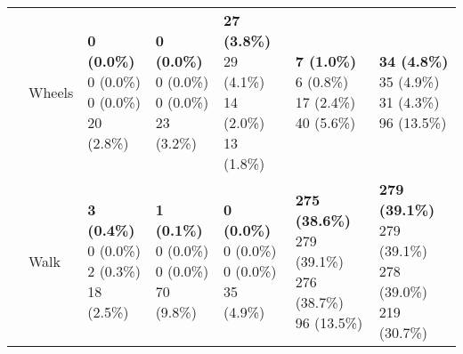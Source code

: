\begin{table}
\begin{center}
\begin{small}
\begin{tabular}{lllllll}
& Wheels      &  \makecell[l]{\textbf{0 (0.0\%)} \\0 (0.0\%) \\0 (0.0\%) \\20 (2.8\%)}      &  \makecell[l]{\textbf{0 (0.0\%)} \\0 (0.0\%) \\0 (0.0\%) \\23 (3.2\%)}      &  \makecell[l]{\textbf{27 (3.8\%)} \\29 (4.1\%) \\14 (2.0\%) \\13 (1.8\%)}      &  \makecell[l]{\textbf{7 (1.0\%)} \\6 (0.8\%) \\17 (2.4\%) \\40 (5.6\%)}      & \makecell[l]{\textbf{34 (4.8\%)} \\35 (4.9\%) \\31 (4.3\%) \\96 (13.5\%) \\} \\ \cline{2-7}
& Walk      &  \makecell[l]{\textbf{3 (0.4\%)} \\0 (0.0\%) \\2 (0.3\%) \\18 (2.5\%)}      &  \makecell[l]{\textbf{1 (0.1\%)} \\0 (0.0\%) \\0 (0.0\%) \\70 (9.8\%)}      &  \makecell[l]{\textbf{0 (0.0\%)} \\0 (0.0\%) \\0 (0.0\%) \\35 (4.9\%)}      &  \makecell[l]{\textbf{275 (38.6\%)} \\279 (39.1\%) \\276 (38.7\%) \\96 (13.5\%)}      & \makecell[l]{\textbf{279 (39.1\%)} \\279 (39.1\%) \\278 (39.0\%) \\219 (30.7\%) \\} \\ \cline{2-7}

\end{tabular}
\end{small}
\end{center}
\end{table}
